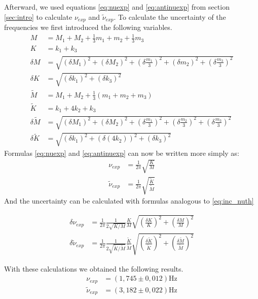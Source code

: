 \documentclass{article}
\begin{document}
Afterward, we used equations \ref{eq:nuexp} and \ref{eq:antinuexp} from section \ref{sec:intro} to calculate
$\nu_{exp}$ and $\tilde \nu_{exp}$. To calculate the uncertainty of the frequencies we first introduced the following variables.
\begin{align}
    M &= M_1 + M_2 + \frac{1}{3} m_1 + m_2 + \frac{1}{3}m_3\\
    K &= k_1 + k_3 \\
    \delta M &= \sqrt{
        ( \delta M_1)^2 + ( \delta M_2)^2 + 
        ( \delta \frac{m_1}{3} )^2 + ( \delta m_2)^2 + 
        ( \delta \frac{m_3}{3} )^2} \\
    \delta K &= \sqrt{
        ( \delta k_1)^2 + ( \delta k_3)^2 } \\
    \tilde M &= M_1 + M_2 + \frac{1}{3} (m_1 + m_2 + m_3) \\
    \tilde K &= k_1 +4k_2 +k_3 \\
    \delta \tilde M &= \sqrt{
        ( \delta M_1)^2 + ( \delta M_2)^2 + 
        ( \delta \frac{m_1}{3} )^2 + 
        ( \delta \frac{m_2}{3} )^2 +
        ( \delta \frac{m_3}{3} )^2} \\
    \delta \tilde K &= \sqrt{
        ( \delta k_1)^2 + ( \delta (4k_2))^2 + 
        ( \delta k_3)^2 } 
\end{align}
Formulas \ref{eq:nuexp} and \ref{eq:antinuexp} can now be written more simply as:
\begin{align}
    \nu_{exp} &= \frac{1}{2\pi}   \sqrt{\frac{ K}{M}} \\
    \tilde \nu_{exp} &= \frac{1}{2\pi}   \sqrt{
    \frac{\tilde K}{\tilde M}  }
\end{align}
And the uncertainty can be calculated with formulas analogous to \ref{eq:inc_nuth}


\begin{align}
\delta \nu_{exp} &= \frac{1}{2\pi} 
        \frac{1}{2\sqrt{K/M}}  \frac{K}{M} 
        \sqrt{ \left ( \frac{ \delta K}{K}  \right ) ^2 +
               \left ( \frac{ \delta M}{M}  \right ) ^2  } \\
    \delta \tilde \nu_{exp} &= \frac{1}{2\pi} 
        \frac{1}{2\sqrt{\tilde K/\tilde M}}  \frac{\tilde K}{\tilde M} 
        \sqrt{ \left ( \frac{ \delta \tilde K}{\tilde K}  \right ) ^2 +
               \left ( \frac{ \delta \tilde M}{\tilde M}  \right ) ^2  } 
\end{align}

With these calculations we obtained the following results.
\begin{align}
           \nu_{exp} &= (1,745 \pm 0,012) \text{Hz}\\
    \tilde \nu_{exp} &= (3,182 \pm 0,022) \text{Hz}
\end{align}
\end{document}
